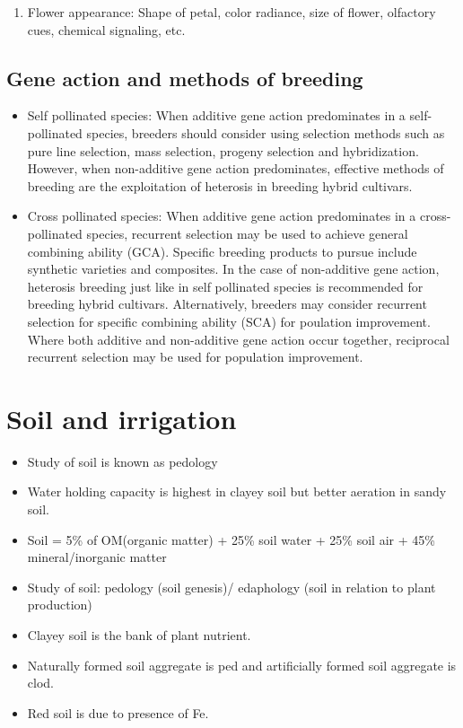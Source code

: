 \documentclass[
  openany]{book}
\providecommand{\tightlist}{%
  \setlength{\itemsep}{0pt}\setlength{\parskip}{0pt}}
\begin{document}
\begin{enumerate}
\def\labelenumi{\arabic{enumi}.}
\setcounter{enumi}{1}
\tightlist
\item
  Flower appearance: Shape of petal, color radiance, size of flower, olfactory cues, chemical signaling, etc.
\end{enumerate}

\hypertarget{gene-action-and-methods-of-breeding}{%
\section{Gene action and methods of breeding}\label{gene-action-and-methods-of-breeding}}

\begin{itemize}
\item
  Self pollinated species: When additive gene action predominates in a self-pollinated species, breeders should consider using selection methods such as pure line selection, mass selection, progeny selection and hybridization. However, when non-additive gene action predominates, effective methods of breeding are the exploitation of heterosis in breeding hybrid cultivars.
\item
  Cross pollinated species: When additive gene action predominates in a cross-pollinated species, recurrent selection may be used to achieve general combining ability (GCA). Specific breeding products to pursue include synthetic varieties and composites. In the case of non-additive gene action, heterosis breeding just like in self pollinated species is recommended for breeding hybrid cultivars. Alternatively, breeders may consider recurrent selection for specific combining ability (SCA) for poulation improvement. Where both additive and non-additive gene action occur together, reciprocal recurrent selection may be used for population improvement.
\end{itemize}

\hypertarget{soil-and-irrigation}{%
\chapter{Soil and irrigation}\label{soil-and-irrigation}}

\begin{itemize}
\tightlist
\item
  Study of soil is known as pedology
\item
  Water holding capacity is highest in clayey soil but better aeration in sandy soil.
\item
  Soil = 5\% of OM(organic matter) + 25\% soil water + 25\% soil air + 45\% mineral/inorganic matter
\item
  Study of soil: pedology (soil genesis)/ edaphology (soil in relation to plant production)
\item
  Clayey soil is the bank of plant nutrient.
\item
  Naturally formed soil aggregate is ped and artificially formed soil aggregate is clod.
\item
  Red soil is due to presence of Fe.
\end{itemize}
\end{document}
